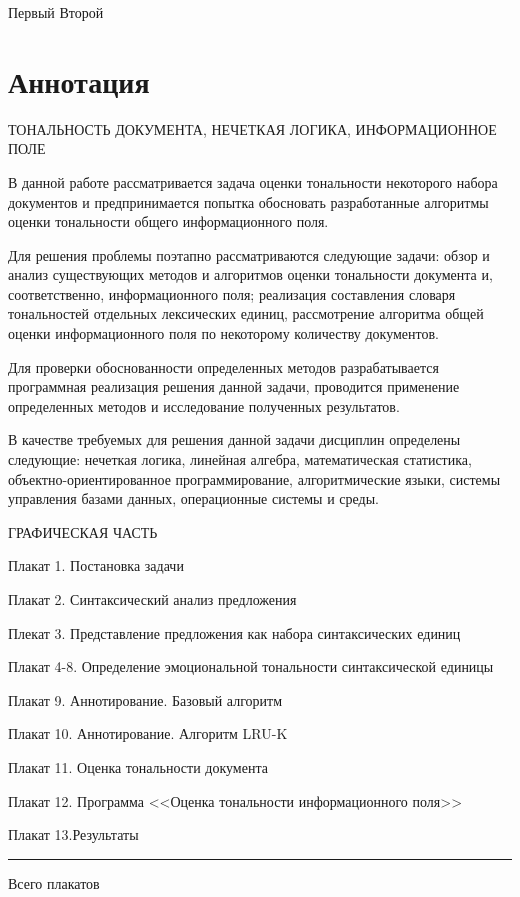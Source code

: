 \documentclass[a4paper,14pt,russian]{extreport}
\begin{document}
Первый
\newpage
Второй
\newpage
\chapter*{Аннотация}

ТОНАЛЬНОСТЬ ДОКУМЕНТА, НЕЧЕТКАЯ ЛОГИКА, ИНФОРМАЦИОННОЕ ПОЛЕ

В данной работе рассматривается задача оценки тональности некоторого набора документов и предпринимается попытка обосновать разработанные алгоритмы оценки тональности общего информационного поля.

Для решения проблемы поэтапно рассматриваются следующие задачи: обзор и анализ существующих методов и алгоритмов оценки тональности документа и, соответственно, информационного поля; реализация составления словаря тональностей отдельных лексических единиц, рассмотрение алгоритма общей оценки информационного поля по некоторому количеству документов.

Для проверки обоснованности определенных методов разрабатывается программная реализация решения данной задачи, проводится применение определенных методов и исследование полученных результатов.

В качестве требуемых для решения данной задачи дисциплин определены следующие: нечеткая логика, линейная алгебра, математическая статистика, объектно-ориентированное программирование, алгоритмические языки, системы управления базами данных, операционные системы и среды.

\begin{center}
ГРАФИЧЕСКАЯ ЧАСТЬ
\end{center}

Плакат 1. Постановка задачи

Плакат 2. Синтаксический анализ предложения

Плекат 3. Представление предложения как набора синтаксических единиц

Плакат 4-8. Определение эмоциональной тональности синтаксической единицы

Плакат 9. Аннотирование. Базовый алгоритм

Плакат 10. Аннотирование. Алгоритм LRU-K

Плакат 11. Оценка тональности документа

Плакат 12. Программа <<Оценка тональности информационного поля>>

Плакат 13.Результаты

\medskip\hrule\medskip

Всего плакатов
\newpage
\tableofcontents
\newpage
\end{document}
